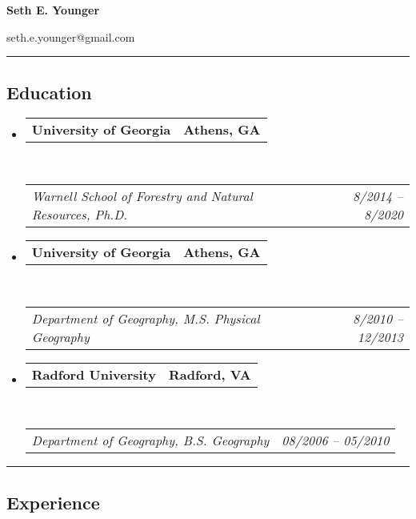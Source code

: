 \documentclass[10pt,letterpaper]{article}
\makeatletter
\newcommand{\headerrow}[2]
{\begin{tabular*}{\linewidth}{l@{\extracolsep{\fill}}r}
		#1 &
		#2 \\
\end{tabular*}}
\makeatother
\begin{document}
	
	
	\begin{center}
		{\LARGE \textbf{Seth E. Younger}}
		
		seth.e.younger@gmail.com\ \ %
	\end{center}
	
	\hrule
	\vspace{-0.4em}
	\subsection*{Education}
	
	\begin{itemize}
		\parskip=0.1em
		
		\item 
		\headerrow
		{\textbf{University of Georgia}}
		{\textbf{Athens, GA}}
		\\
		\headerrow
		{\emph{Warnell School of Forestry and Natural Resources, Ph.D.}}
		{\emph{8/2014 -- 8/2020}}
		
		\item 
		\headerrow
		{\textbf{University of Georgia}}
		{\textbf{Athens, GA}}
		\\
		\headerrow
		{\emph{Department of Geography, M.S. Physical Geography}}
		{\emph{8/2010 -- 12/2013}}
		
		\item 
		\headerrow
		{\textbf{Radford University}}
		{\textbf{Radford, VA}}
		\\
		\headerrow
		{\emph{Department of Geography, B.S. Geography}}
		{\emph{08/2006 -- 05/2010}}
		
	\end{itemize}
	
	\hrule
	\vspace{-0.4em}
	\subsection*{Experience}
	
\end{document}
